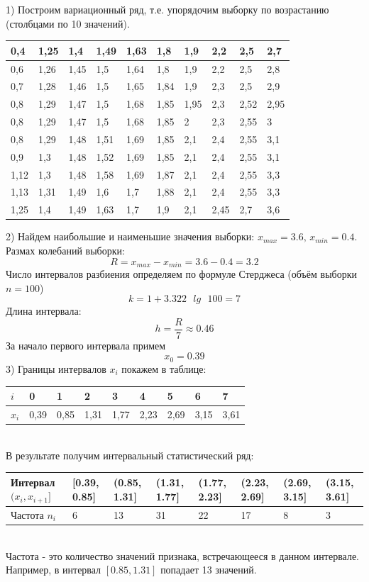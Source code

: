 \documentclass[a4paper,12pt]{article} %
\begin{document}
1) Построим вариационный ряд, т.е. упорядочим выборку по возрастанию
(столбцами по 10 значений).\\
\begin{center}
\begin{tabular}{ | l | l | l | l | l | l | l | l | l | l | }
\hline
	0,4 & 1,25 & 1,4 & 1,49 & 1,63 & 1,8 & 1,9 & 2,2 & 2,5 & 2,7 \\ \hline
	0,6 & 1,26 & 1,45 & 1,5 & 1,64 & 1,8 & 1,9 & 2,2 & 2,5 & 2,8 \\ \hline
	0,7 & 1,28 & 1,46 & 1,5 & 1,65 & 1,84 & 1,9 & 2,3 & 2,5 & 2,9 \\ \hline
	0,8 & 1,29 & 1,47 & 1,5 & 1,68 & 1,85 & 1,95 & 2,3 & 2,52 & 2,95 \\ \hline
	0,8 & 1,29 & 1,47 & 1,5 & 1,68 & 1,85 & 2 & 2,3 & 2,55 & 3 \\ \hline
	0,8 & 1,29 & 1,48 & 1,51 & 1,69 & 1,85 & 2,1 & 2,4 & 2,55 & 3,1 \\ \hline
	0,9 & 1,3 & 1,48 & 1,52 & 1,69 & 1,85 & 2,1 & 2,4 & 2,55 & 3,1 \\ \hline
	1,12 & 1,3 & 1,48 & 1,58 & 1,69 & 1,87 & 2,1 & 2,4 & 2,55 & 3,3 \\ \hline
	1,13 & 1,31 & 1,49 & 1,6 & 1,7 & 1,88 & 2,1 & 2,4 & 2,55 & 3,3 \\ \hline
	1,25 & 1,4 & 1,49 & 1,63 & 1,7 & 1,9 & 2,1 & 2,45 & 2,7 & 3,6 \\ \hline
\end{tabular}
\end{center}
2) Найдем наибольшие и наименьшие значения выборки: $x_{max} = 3.6\text{, } x_{min} =
0.4$. Размах колебаний выборки:
\[
  R = x_{max} - x_{min} = 3.6 - 0.4 = 3.2
\]
Число интервалов разбиения определяем по формуле Стерджеса (объём выборки
$n = 100$)
\[
  k = 1 + 3.322\text{ }lg\text{ }100 = 7
\]
Длина интервала:
\[
  h = \frac{R}{7} \approx 0.46
\]
За начало первого интервала примем
\[
  x_0 = 0.39
\]
3) Границы интервалов $x_i$ покажем в таблице:\\
\begin{tabular}{ | l | l | l | l | l | l | l | l | l | }
\hline
	$i$ & 0 & 1 & 2 & 3 & 4 & 5 & 6 & 7 \\ \hline
	$x_i$ & 0,39 & 0,85 & 1,31 & 1,77 & 2,23 & 2,69 & 3,15 & 3,61 \\ \hline
\end{tabular}\\

В результате получим интервальный статистический ряд:\\
\newline
\begin{tabular}{ | p{2cm} | p{1cm} | p{1cm} | p{1cm} | p{1cm} | p{1cm} | p{1cm} | p{1cm} |}
\hline
	Интервал $(x_i, x_{i+1}]$ & [0.39, 0.85] & (0.85, 1.31] & (1.31, 1.77] & (1.77, 2.23] & (2.23, 2.69] & (2.69, 3.15] & (3.15, 3.61]\\ \hline
	Частота $n_i$ & 6 & 13 & 31 & 22 & 17 & 8 & 3\\ \hline
\end{tabular}\\
Частота - это количество значений признака, встречающееся в данном
интервале. Например, в интервал $[0.85, 1.31]$ попадает 13 значений.
\newline
\end{document}
